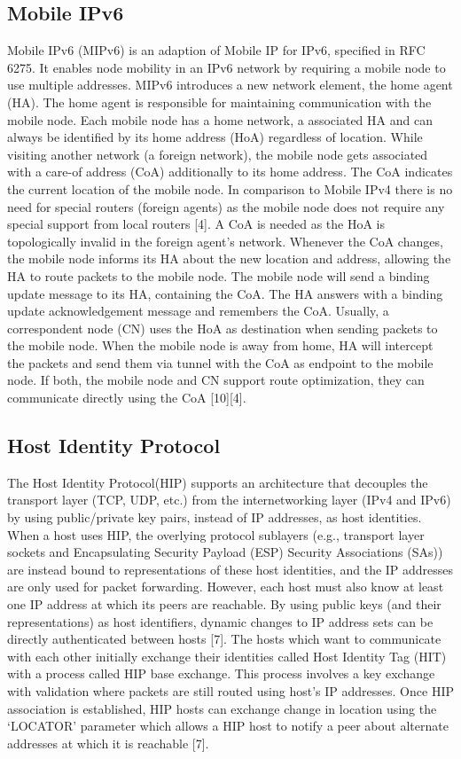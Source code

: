 \documentclass{llncs}
\begin{document}
\subsection{Mobile IPv6}
Mobile IPv6 (MIPv6) is an adaption of Mobile IP for IPv6, specified in RFC 6275. It enables node mobility in an IPv6 network by requiring a mobile node to use multiple addresses. MIPv6 introduces a new network element,  the home agent (HA). The home agent is responsible for maintaining communication with the mobile node. Each mobile node has a home network, a associated HA and can always be identified by its home address (HoA) regardless of location. While visiting another network (a foreign network), the mobile node gets associated with a care-of address (CoA) additionally to its home address. The CoA indicates the current location of the mobile node. In comparison to Mobile IPv4 there is no need for special routers (foreign agents) as the mobile node does not require any special support from local routers [4]. A CoA is needed as the HoA is topologically invalid in the foreign agent’s network. Whenever the CoA changes, the mobile node informs its HA about the new location and address, allowing the HA to route packets to the mobile node. The mobile node will send a binding update message to its HA, containing the CoA. The HA answers with a binding update acknowledgement message and remembers the CoA.
Usually, a correspondent node (CN) uses the HoA as destination when sending packets to the mobile node. When the mobile node is away from home, HA will intercept the packets and send them via tunnel with the CoA as endpoint to the mobile node. If both, the mobile node and CN support route optimization, they can communicate directly using the CoA [10][4].

\subsection{Host Identity Protocol}
The Host Identity Protocol(HIP) supports an architecture that decouples the transport layer (TCP, UDP, etc.) from the internetworking layer (IPv4 and IPv6) by using public/private key pairs, instead of IP addresses, as host identities.  When a host uses HIP, the overlying protocol sublayers (e.g., transport layer sockets and Encapsulating Security Payload (ESP) Security Associations (SAs)) are instead bound to representations of these host identities, and the IP addresses are only used for packet forwarding.  However, each host must also know at least one IP address at which its peers are reachable.  By using public keys (and their representations) as host identifiers, dynamic changes to IP address sets can be directly authenticated between hosts [7].
The hosts which want to communicate with each other initially exchange their identities called Host Identity Tag (HIT) with a process called HIP base exchange. This process involves a key exchange with validation where packets are still routed using host’s IP addresses.  Once HIP association is established, HIP hosts can exchange change in location using the ‘LOCATOR’ parameter which allows a HIP host to notify a peer about alternate addresses at which it is reachable [7].
\end{document}
